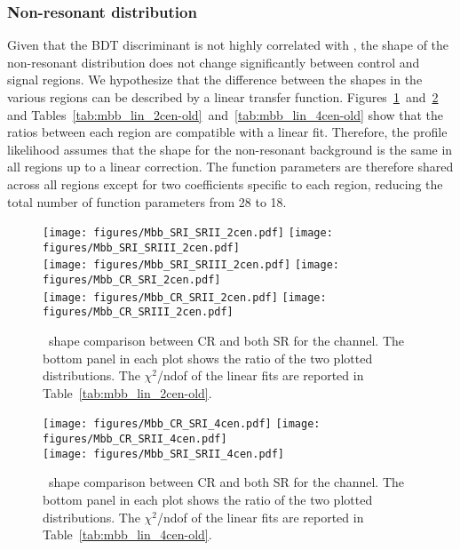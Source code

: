 \subsubsection{Non-resonant \Mbb{} distribution}
\label{sec:nonres-old}

Given that the BDT discriminant is not highly correlated with \Mbb{}, the shape of the non-resonant distribution does not change significantly between
control and signal regions.  We hypothesize that the difference between the shapes in the various regions can be described by a linear transfer function.  
Figures~\ref{fig:mbb_2tag_2cen-old}~and~\ref{fig:mbb_2tag_4cen-old} and 
Tables~\ref{tab:mbb_lin_2cen-old}~and~\ref{tab:mbb_lin_4cen-old} show that the ratios
 between each region are compatible with a linear fit. 
Therefore,  the profile likelihood assumes that the shape for the non-resonant background
is the same in all regions up to a linear correction. The function parameters are therefore
shared across all regions except for two coefficients specific to each region, reducing the total number of function parameters from 28 to 18.

\begin{figure}[htbp]
  \centering
 \texttt{[image: figures/Mbb\_SRI\_SRII\_2cen.pdf]}
 \texttt{[image: figures/Mbb\_SRI\_SRIII\_2cen.pdf]}\\
 \texttt{[image: figures/Mbb\_SRI\_SRIII\_2cen.pdf]}
 \texttt{[image: figures/Mbb\_CR\_SRI\_2cen.pdf]}\\
 \texttt{[image: figures/Mbb\_CR\_SRII\_2cen.pdf]}
 \texttt{[image: figures/Mbb\_CR\_SRIII\_2cen.pdf]}\\

\caption{\Mbb~shape comparison between CR and both SR for the \twocentral channel.  The bottom panel in each plot shows the ratio of the two plotted distributions. The $\chi^2$/ndof of the linear fits are reported in Table~\ref{tab:mbb_lin_2cen-old}.}
  \label{fig:mbb_2tag_2cen-old}
\end{figure}

\begin{figure}[htbp]
  \centering
 \texttt{[image: figures/Mbb\_CR\_SRI\_4cen.pdf]}
 \texttt{[image: figures/Mbb\_CR\_SRII\_4cen.pdf]}\\
 \texttt{[image: figures/Mbb\_SRI\_SRII\_4cen.pdf]}\\
\caption{\Mbb~shape comparison between CR and both SR for the \fourcentral channel.  The bottom panel in each plot shows the ratio of the two plotted distributions.  The $\chi^2$/ndof of the linear fits are reported in Table~\ref{tab:mbb_lin_4cen-old}.}
  \label{fig:mbb_2tag_4cen-old}
\end{figure}


